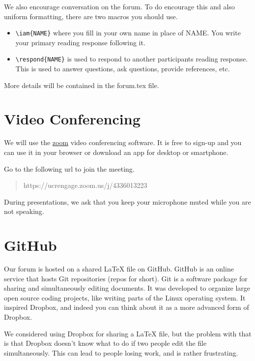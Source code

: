 \documentclass[11pt, oneside]{article}
\begin{document}
We also encourage conversation on the forum.  To do
encourage this and also uniform formatting, there are two
macros you should use.
\begin{itemize}
\item \texttt{\textbackslash iam\{NAME\}} where you fill in
  your own name in place of NAME.  You write your primary
  reading response following it.
\item \texttt{\textbackslash respond\{NAME\}} is used to
  respond to another participants reading response.  This is
  used to answer questions, ask questions, provide
  references, etc.
\end{itemize}
More details will be contained in the forum.tex file.  

\pagebreak

\section{Video Conferencing}
\label{sec:video}

We will use the \href{https://zoom.us/}{zoom} video
conferencing software. It is free to sign-up and you can use
it in your browser or download an app for desktop or smartphone.

Go to the following url to join the meeting.

\begin{quote}
  https://ucrengage.zoom.us/j/4336013223
\end{quote}

During presentations, we ask that you keep your microphone
muted while you are not speaking. 

\pagebreak

\section{GitHub}
\label{sec:github}

Our forum is hosted on a shared LaTeX file on GitHub.
GitHub is an online service that hosts Git repositories
(repos for short). Git is a software package for sharing and
simultaneously editing documents. It was developed to
organize large open source coding projects, like writing
parts of the Linux operating system. It inspired Dropbox,
and indeed you can think about it as a more advanced form of
Dropbox.

We considered using Dropbox for sharing a LaTeX file, but
the problem with that is that Dropbox doesn't know what to
do if two people edit the file simultaneously. This can lead
to people losing work, and is rather frustrating.
\end{document}
